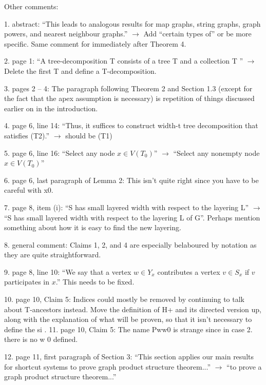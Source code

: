 \documentclass[12pt]{article}
\begin{document}
Other comments:

1. abstract: “This leads to analogous results for map graphs, string graphs, graph powers, and nearest neighbour graphs.” $\longrightarrow$ Add “certain types of” or be more specific. Same comment for immediately after Theorem 4.

2. page 1: “A tree-decomposition T consists of a tree T and a collection
T ” $\longrightarrow$ Delete the first T and define a T-decomposition.

3. pages 2 – 4: The paragraph following Theorem 2 and Section 1.3
(except for the fact that the apex assumption is necessary) is repetition
of things discussed earlier on in the introduction.

4. page 6, line 14: “Thus, it suffices to construct width-t tree decomposition that satisfies (T2).” $\longrightarrow$ should be (T1)

5. page 6, line 16: “Select any node $x \in V (T_0)$” $\longrightarrow$ “Select any nonempty node $x \in V (T_0)$”

6. page 6, last paragraph of Lemma 2: This isn’t quite right since you
have to be careful with x0.

7. page 8, item (i): “S has small layered width with respect to the layering
L” $\longrightarrow$ “S has small layered width with respect to the layering L of
G”. Perhaps mention something about how it is easy to find the new
layering.

8. general comment: Claims 1, 2, and 4 are especially belaboured by
notation as they are quite straightforward.

9. page 8, line 10: “We say that a vertex $w \in Y_x$ contributes a vertex
$v \in S_x$ if $v$ participates in $x$.” This needs to be fixed.

10. page 10, Claim 5: Indices could mostly be removed by continuing
to talk about T-ancestors instead. Move the definition of H+ and its
directed version up, along with the explanation of what will be proven,
so that it isn’t necessary to define the si
.
11. page 10, Claim 5: The name Pww0 is strange since in case 2. there is
no w
0 defined.

12. page 11, first paragraph of Section 3: “This section applies our main
results for shortcut systems to prove graph product structure theorem...” $\longrightarrow$ “to prove a graph product structure theorem...”
\end{document}
